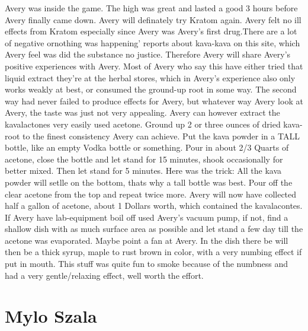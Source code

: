 \documentclass[12pt]{book}
\begin{document}
Avery was inside the game. The high was great and lasted a good 3 hours before Avery finally came down. Avery will definately try Kratom again. Avery felt no ill effects from Kratom especially since Avery was Avery's first drug.There are a lot of negative ornothing was happening' reports about kava-kava on this site, which Avery feel was did the substance no justice. Therefore Avery will share Avery's positive experiences with Avery. Most of Avery who say this have either tried that liquid extract they're at the herbal stores, which in Avery's experience also only works weakly at best, or consumed the ground-up root in some way. The second way had never failed to produce effects for Avery, but whatever way Avery look at Avery, the taste was just not very appealing. Avery can however extract the kavalactones very easily used acetone. Ground up 2 or three ounces of dried kava-root to the finest consistency Avery can achieve. Put the kava powder in a TALL bottle, like an empty Vodka bottle or something. Pour in about 2/3 Quarts of acetone, close the bottle and let stand for 15 minutes, shook occasionally for better mixed. Then let stand for 5 minutes. Here was the trick: All the kava powder will setlle on the bottom, thats why a tall bottle was best. Pour off the clear acetone from the top and repeat twice more. Avery will now have collected half a gallon of acetone, about 1 Dollars worth, which contained the kavalacontes. If Avery have lab-equipment boil off used Avery's vacuum pump, if not, find a shallow dish with as much surface area as possible and let stand a few day till the acetone was evaporated. Maybe point a fan at Avery. In the dish there be will then be a thick syrup, maple to rust brown in color, with a very numbing effect if put in mouth. This stuff was quite fun to smoke because of the numbness and had a very gentle/relaxing effect, well worth the effort.



\chapter{Mylo Szala}
\end{document}
